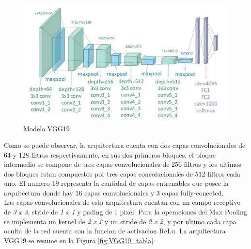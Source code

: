 				
				\begin{figure}[ht]
					\centering
					\includegraphics[scale=0.45]{Figs/22.jpeg}
					\caption{Modelo VGG19}
					\label{fig:VGG19}
				\end{figure}			
				
				
				Como se puede observar, la arquitectura cuenta con dos capas convolucionales de 64 y 128 filtros respectivamente, en sus dos primeros bloques, el bloque intermedio se compone de tres capas convolucionales de 256 filtros y los ultimos dos bloques estan compuestos por tres capas concolucionales de 512 filtros cada uno. El numero 19 representa la cantidad de capas entrenables que posee la arquitectura donde hay 16 capas convolucionales y 3 capas fully-conected.\\
				
				Las capas convolucionales de esta arquitectura cuentan con un campo receptivo de \textit{3 x 3}, stride de \textit{1 x 1} y pading de 1 pixel. Para la operaciones del Max Pooling se implementa un kernel de \textit{2 x 2} y un stride de \textit{2 x 2}, y por ultimo cada capa oculta de la red cuenta con la funcion de activacion ReLu. La arquitectura VGG19 se resume en la Figura \ref{fig:VGG19_tabla}.
				
